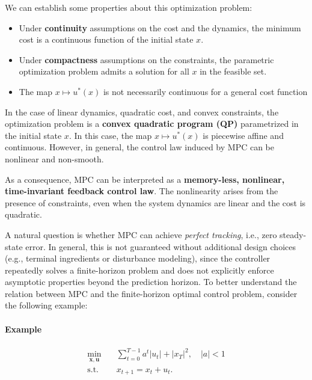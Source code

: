 We can establish some properties about this optimization problem:
\begin{itemize}
    \item Under \textbf{continuity} assumptions on the cost and the dynamics, the minimum cost is a continuous function of the initial state $x$.
    \item Under \textbf{compactness} assumptions on the constraints, the parametric optimization problem admits a solution for all $x$ in the feasible set.
    \item The map $x \mapsto u^*(x)$ is not necessarily continuous for a general cost function
\end{itemize}
In the case of linear dynamics, quadratic cost, and convex constraints, the optimization problem is a \textbf{convex quadratic program (QP)} parametrized in the initial state $x$. In this case, the map $x \mapsto u^*(x)$ is piecewise affine and continuous. However, in general, the control law induced by MPC can be nonlinear and non-smooth.
\begin{theorembox}
As a consequence, MPC can be interpreted as a \textbf{memory-less, nonlinear, time-invariant feedback control law}. The nonlinearity arises from the presence of constraints, even when the system dynamics are linear and the cost is quadratic.\\
\end{theorembox}

A natural question is whether MPC can achieve \emph{perfect tracking}, i.e., zero steady-state error. In general, this is not guaranteed without additional design choices (e.g., terminal ingredients or disturbance modeling), since the controller repeatedly solves a finite-horizon problem and does not explicitly enforce asymptotic properties beyond the prediction horizon.
To better understand the relation between MPC and the finite-horizon optimal control problem, consider the following example:
\paragraph{Example}
\begin{align*}
\min_{\mathbf{x},\mathbf{u}} \quad & \sum_{t=0}^{T-1} a^t |u_t| + |x_T|^2, \quad |a| < 1 \\
\text{s.t.} \quad & x_{t+1} = x_t + u_t.
\end{align*}

